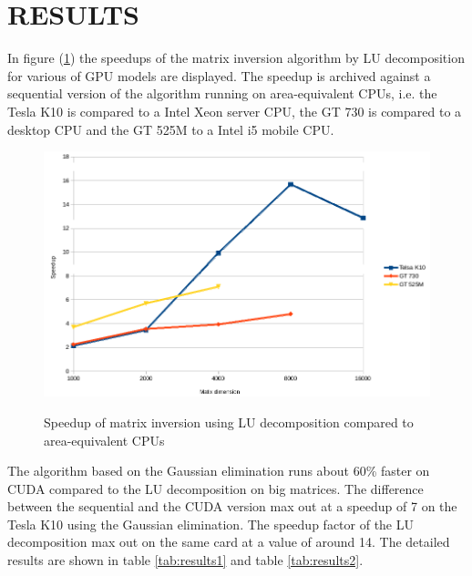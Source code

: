 
\section{RESULTS}\label{sec:results}
In figure (\ref{fig:speedup}) the speedups of the matrix inversion algorithm by LU decomposition for various of GPU models are displayed. The speedup is archived against a sequential version of the algorithm running on area-equivalent CPUs, i.e. the Tesla K10 is compared to a Intel Xeon server CPU, the GT 730 is compared to a desktop CPU and the GT 525M to a Intel i5 mobile CPU. 
\begin{figure}
	\includegraphics[width=18cm]{figs/speedup.png}
	\centering
	\label{fig:speedup}
	\caption{Speedup of matrix inversion using LU decomposition compared to area-equivalent CPUs}
\end{figure}

The algorithm based on the Gaussian elimination runs about 60\% faster on CUDA compared to the LU decomposition on big matrices. The difference between the sequential and the CUDA version max out at a speedup of 7 on the Tesla K10 using the Gaussian elimination. The speedup factor of the LU decomposition max out on the same card at a value of around 14. The detailed results are shown in table \ref{tab:results1} and table \ref{tab:results2}.

